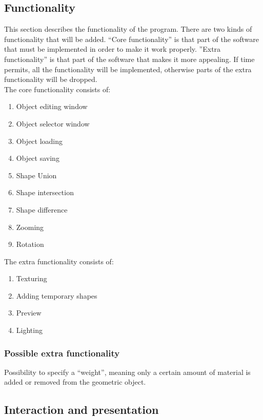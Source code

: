\documentclass[a4paper,10pt,twocolumn]{article}
\begin{document}
\subsection{Functionality}
This section describes the functionality of the program. There are two kinds of functionality that will be added. ``Core functionality'' is that part of the software that must be implemented in order to make it work properly. ''Extra functionality'' is that part of the software that makes it more appealing. If time permits, all the functionality will be implemented, otherwise parts of the extra functionality will be dropped.\\

The core functionality consists of: \\
\vspace{-10pt}
\begin{enumerate}
    \setlength{\itemsep}{-0.3em}
	\item Object editing window
	\item Object selector window
	\item Object loading
	\item Object saving
	\item Shape Union
	\item Shape intersection
	\item Shape difference
	\item Zooming
	\item Rotation
\end{enumerate}
\bigskip
The extra functionality consists of: \\
\vspace{-10pt}
\begin{enumerate}
    \setlength{\itemsep}{-0.3em}
	\item Texturing
	\item Adding temporary shapes
	\item Preview
	\item Lighting
\end{enumerate}

\subsubsection{Possible extra functionality}
Possibility to specify a ``weight'', meaning only a certain amount of material is added or removed from the geometric object.

\subsection{Interaction and presentation}
\end{document}
